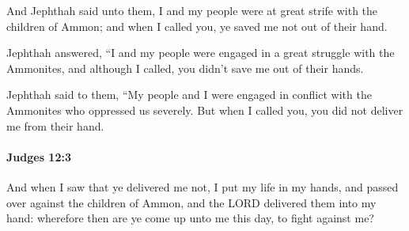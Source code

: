 			\begin{versebox}
					\item[BHS] 
					\item[ASV] And Jephthah said unto them, I and my people were at great strife with the children of Ammon; and when I called you, ye saved me not out of their hand.
					\item[NIV] Jephthah answered, “I and my people were engaged in a great struggle with the Ammonites, and although I called, you didn’t save me out of their hands.
					\item[NRSV] Jephthah said to them, “My people and I were engaged in conflict with the Ammonites who oppressed us severely. But when I called you, you did not deliver me from their hand.
			\end{versebox}

		\paragraph{Judges 12:3} %
			\label{JUDGES-12-3}

			And when I saw that ye delivered me not, I put my life in my hands, and passed over against the children of Ammon, and the LORD delivered them into my hand: wherefore then are ye come up unto me this day, to fight against me?

